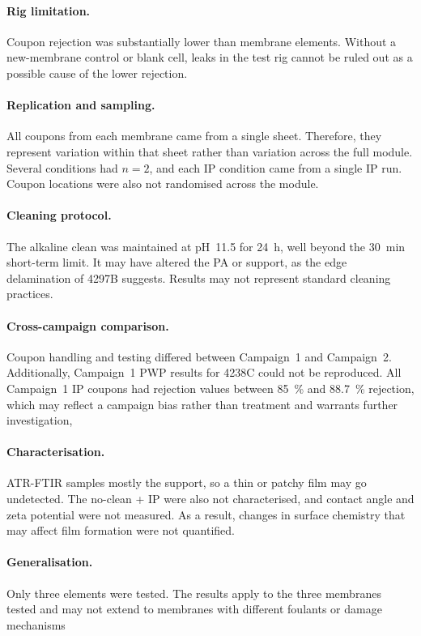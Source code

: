 \paragraph{Rig limitation.}
Coupon rejection was substantially lower than membrane elements. Without a new-membrane control or blank cell, leaks in the test rig cannot be ruled out as a possible cause of the lower rejection.

\paragraph{Replication and sampling.}
All coupons from each membrane came from a single sheet. Therefore, they represent variation within that sheet rather than variation across the full module. Several conditions had $n = 2$, and each IP condition came from a single IP run. Coupon locations were also not randomised across the module. 

\paragraph{Cleaning protocol.}
The alkaline clean was maintained at pH~11.5 for \qty{24}{\hour}, well beyond the \qty{30}{\minute} short-term limit. It may have altered the PA or support, as the edge delamination of 4297B suggests. Results may not represent standard cleaning practices.

\paragraph{Cross-campaign comparison.}
Coupon handling and testing differed between Campaign~1 and Campaign~2. Additionally, Campaign~1 PWP results for 4238C could not be reproduced. All Campaign~1 IP coupons had rejection values between \qty{85}{\percent} and \qty{88.7}{\percent} rejection, which may reflect a campaign bias rather than treatment and warrants further investigation, 

\paragraph{Characterisation.}
ATR-FTIR samples mostly the support, so a thin or patchy film may go undetected. The no-clean + IP were also not characterised, and contact angle and zeta potential were not measured. As a result, changes in surface chemistry that may affect film formation were not quantified.

\paragraph{Generalisation.}
Only three elements were tested. The results apply to the three membranes tested and may not extend to membranes with different foulants or damage mechanisms


